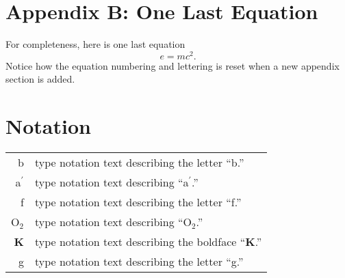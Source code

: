 \begin{article}
\section{Appendix B: One Last Equation}
For completeness, here is one last equation
\setcounter{equation}{0}  
\begin{equation}
e = mc^2.
\end{equation}
Notice how the equation numbering and lettering 
is reset when a new appendix section is added.


%
%

\setcounter{secnumdepth}{0}
\section{Notation}
\begin{tabular}{rp{17.5pc}}
\hspace{-2em} b                                        &
type notation text describing the letter ``b.''        \\
\hspace{-2em} a$^{\prime}$                             &
type notation text describing ``a$^{\prime}$.''        \\
\hspace{-2em} f                                        &
type notation text describing the letter ``f.''        \\
\hspace{-2em} O$_2$                                    &
type notation text describing ``O$_2$.''               \\
\hspace{-2em} {\bf K}                                  &
type notation text describing the boldface ``{\bf K}.''\\
\hspace{-2em} g                                        &
type notation text describing the letter ``g.''        \\
\end{tabular}



\end{article}
